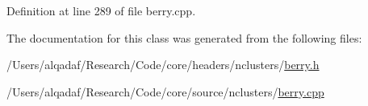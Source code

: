 Definition at line 289 of file berry.cpp.



The documentation for this class was generated from the following files:\begin{DoxyCompactItemize}
\item 
/Users/alqadaf/Research/Code/core/headers/nclusters/\hyperlink{berry_8h}{berry.h}\item 
/Users/alqadaf/Research/Code/core/source/nclusters/\hyperlink{berry_8cpp}{berry.cpp}\end{DoxyCompactItemize}
